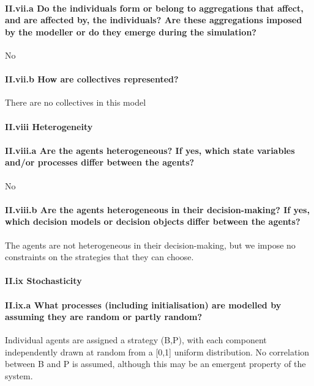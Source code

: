 \documentclass[12pt, a4paper]{article}
\begin{document}
\paragraph{II.vii.a Do the individuals form or belong to aggregations that affect, and are affected by, the individuals? Are these aggregations imposed by the modeller or do they emerge during the simulation?}

No

\paragraph{II.vii.b How are collectives represented?}
There are no collectives in this model

\paragraph{II.viii Heterogeneity}

\paragraph{II.viii.a Are the agents heterogeneous? If yes, which state variables and/or processes differ between the agents?}
No

\paragraph{II.viii.b Are the agents heterogeneous in their decision-making? If yes, which decision models or decision objects differ between the agents?}

The agents are not heterogeneous in their decision-making, but we impose no constraints on the strategies that they can choose.

\paragraph{II.ix Stochasticity}

\paragraph{II.ix.a What processes (including initialisation) are modelled by assuming they are random or partly random?}

Individual agents are assigned a strategy (B,P), with each component independently drawn at random from a [0,1] uniform distribution. No correlation between B and P is assumed, although this may be an emergent property of the system.
\end{document}
